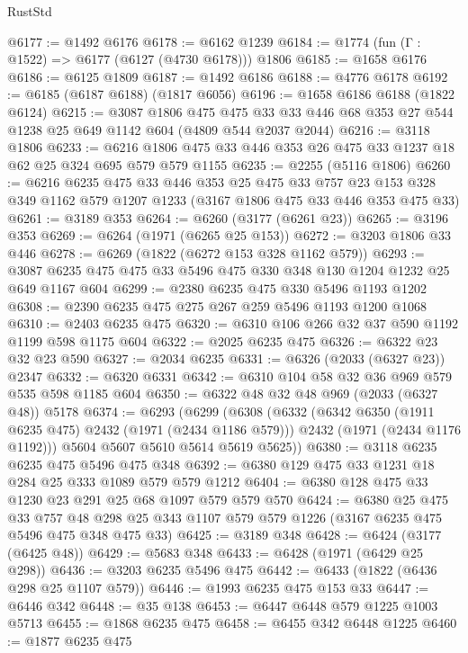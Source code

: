 \begin{lexlean}{RustStd}
\begin{coremodule}
@6177 := @1492 @6176
@6178 := @6162 @1239
@6184 := @1774 (fun (Γ : @1522) => @6177 (@6127 (@4730 @6178))) @1806
@6185 := @1658 @6176
@6186 := @6125 @1809
@6187 := @1492 @6186
@6188 := @4776 @6178
@6192 := @6185 (@6187 @6188) (@1817 @6056)
@6196 := @1658 @6186 @6188 (@1822 @6124)
@6215 := @3087
    @1806
    @475
    @475
    @33
    @33
    @446
    @68
    @353
    @27
    @544
    @1238
    @25
    @649
    @1142
    @604
    (@4809 @544 @2037 @2044)
@6216 := @3118 @1806
@6233 := @6216 @1806 @475 @33 @446 @353 @26 @475 @33 @1237 @18 @62 @25 @324 @695 @579 @579 @1155
@6235 := @2255 (@5116 @1806)
@6260 := @6216
    @6235
    @475
    @33
    @446
    @353
    @25
    @475
    @33
    @757
    @23
    @153
    @328
    @349
    @1162
    @579
    @1207
    @1233
    (@3167 @1806 @475 @33 @446 @353 @475 @33)
@6261 := @3189 @353
@6264 := @6260 (@3177 (@6261 @23))
@6265 := @3196 @353
@6269 := @6264 (@1971 (@6265 @25 @153))
@6272 := @3203 @1806 @33 @446
@6278 := @6269 (@1822 (@6272 @153 @328 @1162 @579))
@6293 := @3087 @6235 @475 @475 @33 @5496 @475 @330 @348 @130 @1204 @1232 @25 @649 @1167 @604
@6299 := @2380 @6235 @475 @330 @5496 @1193 @1202
@6308 := @2390 @6235 @475 @275 @267 @259 @5496 @1193 @1200 @1068
@6310 := @2403 @6235 @475
@6320 := @6310 @106 @266 @32 @37 @590 @1192 @1199 @598 @1175 @604
@6322 := @2025 @6235 @475
@6326 := @6322 @23 @32 @23 @590
@6327 := @2034 @6235
@6331 := @6326 (@2033 (@6327 @23)) @2347
@6332 := @6320 @6331
@6342 := @6310 @104 @58 @32 @36 @969 @579 @535 @598 @1185 @604
@6350 := @6322 @48 @32 @48 @969 (@2033 (@6327 @48)) @5178
@6374 := @6293
    (@6299
      (@6308
        (@6332
          (@6342 @6350 (@1911 @6235 @475) @2432 (@1971 (@2434 @1186 @579)))
          @2432
          (@1971 (@2434 @1176 @1192)))
        @5604
        @5607
        @5610
        @5614
        @5619
        @5625))
@6380 := @3118 @6235 @6235 @475 @5496 @475 @348
@6392 := @6380 @129 @475 @33 @1231 @18 @284 @25 @333 @1089 @579 @579 @1212
@6404 := @6380 @128 @475 @33 @1230 @23 @291 @25 @68 @1097 @579 @579 @570
@6424 := @6380
    @25
    @475
    @33
    @757
    @48
    @298
    @25
    @343
    @1107
    @579
    @579
    @1226
    (@3167 @6235 @475 @5496 @475 @348 @475 @33)
@6425 := @3189 @348
@6428 := @6424 (@3177 (@6425 @48))
@6429 := @5683 @348
@6433 := @6428 (@1971 (@6429 @25 @298))
@6436 := @3203 @6235 @5496 @475
@6442 := @6433 (@1822 (@6436 @298 @25 @1107 @579))
@6446 := @1993 @6235 @475 @153 @33
@6447 := @6446 @342
@6448 := @35 @138
@6453 := @6447 @6448 @579 @1225 @1003 @5713
@6455 := @1868 @6235 @475
@6458 := @6455 @342 @6448 @1225
@6460 := @1877 @6235 @475

\end{coremodule}
\end{lexlean}
